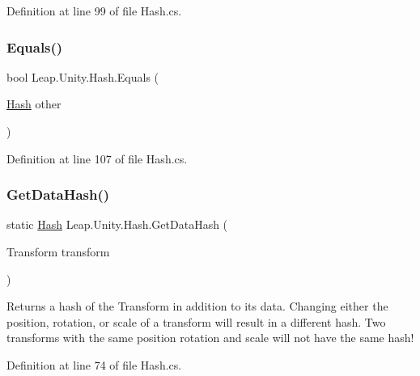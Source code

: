 Definition at line 99 of file Hash.\+cs.

\mbox{\label{struct_leap_1_1_unity_1_1_hash_a1e99f703a48e5e4087b2b284abd2a887}} 
\subsubsection{\texorpdfstring{Equals()}{Equals()}\hspace{0.1cm}{\footnotesize\ttfamily [2/2]}}
{\footnotesize\ttfamily bool Leap.\+Unity.\+Hash.\+Equals (\begin{DoxyParamCaption}\item[{\mbox{\hyperlink{struct_leap_1_1_unity_1_1_hash}{Hash}}}]{other }\end{DoxyParamCaption})}



Definition at line 107 of file Hash.\+cs.

\mbox{\label{struct_leap_1_1_unity_1_1_hash_a041d41aae91527057d3731f07c41a29b}} 
\subsubsection{\texorpdfstring{GetDataHash()}{GetDataHash()}}
{\footnotesize\ttfamily static \mbox{\hyperlink{struct_leap_1_1_unity_1_1_hash}{Hash}} Leap.\+Unity.\+Hash.\+Get\+Data\+Hash (\begin{DoxyParamCaption}\item[{Transform}]{transform }\end{DoxyParamCaption})\hspace{0.3cm}{\ttfamily [static]}}



Returns a hash of the Transform in addition to it\textquotesingle{}s data. Changing either the position, rotation, or scale of a transform will result in a different hash. Two transforms with the same position rotation and scale will not have the same hash! 



Definition at line 74 of file Hash.\+cs.

\mbox{\label{struct_leap_1_1_unity_1_1_hash_acbae9a5f2f31c33d8f0bc770a3bc60a1}} 
